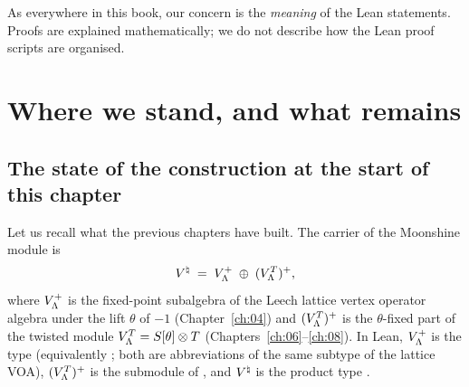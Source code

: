 As everywhere in this book, our concern is the \emph{meaning} of the Lean statements.  Proofs are
explained mathematically; we do not describe how the Lean proof scripts are organised.

\section{Where we stand, and what remains}\label{ch14:sec:intro}

\subsection{The state of the construction at the start of this chapter}

Let us recall what the previous chapters have built.  The carrier of the Moonshine module is
\begin{equation*}
  {V^{\natural}} \;=\; V_{{\Lambda}}^{+}\;\oplus\;(V_{{\Lambda}}^{T})^{+},
\end{equation*}
where $V_{\Lambda}^+$ is the fixed-point subalgebra of the Leech lattice vertex operator algebra under
the lift $\theta$ of $-1$ (Chapter~\ref{ch:04}) and $(V_{\Lambda}^T)^+$ is the $\theta$-fixed part of
the twisted module $V_{\Lambda}^T=S[\theta]\otimes T$ (Chapters~\ref{ch:06}--\ref{ch:08}).  In Lean,
$V_{\Lambda}^+$ is the type  (equivalently ; both are abbreviations of the
same subtype of the lattice VOA), $(V_{\Lambda}^T)^+$ is the submodule  of
, and ${V^{\natural}}$ is the product type .

